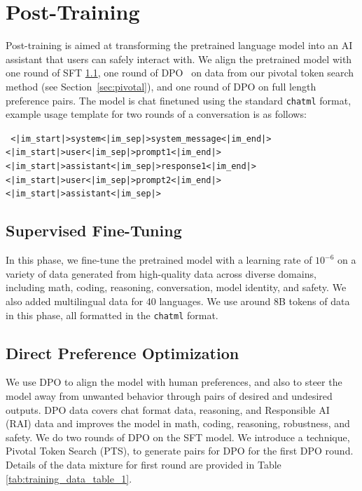 \documentclass[11pt]{article}
\begin{document}
\section{Post-Training}
Post-training is aimed at transforming the pretrained language model into an AI assistant that users can safely interact with. 
We align the pretrained model with one round of SFT \ref{sec:sft}, one round of DPO~\cite{rafailov2023direct} on data from our pivotal token search method (see Section~\ref{sec:pivotal}), and one round of DPO on full length preference pairs.
The model is chat finetuned using the standard \texttt{chatml} format, example usage template for two rounds of a conversation is as follows:
\begin{AIbox}{}
\tt \footnotesize 
<\!|\!im\_start\!|\!>system<\!|\!im\_sep\!|\!>system\_message<\!|\!im\_end\!|\!>\\
<\!|\!im\_start\!|\!>user<\!|\!im\_sep\!|\!>prompt1<\!|\!im\_end\!|\!><\!|\!im\_start\!|\!>assistant<\!|\!im\_sep\!|\!>response1<\!|\!im\_end\!|\!>\\
<\!|\!im\_start\!|\!>user<\!|\!im\_sep\!|\!>prompt2<\!|\!im\_end\!|\!><\!|\!im\_start\!|\!>assistant<\!|\!im\_sep\!|\!>
\end{AIbox}

\subsection{Supervised Fine-Tuning} \label{sec:sft}
In this phase, we fine-tune the pretrained model with a learning rate of $10^{-6}$ on a variety of data generated from high-quality data across diverse domains, including math, coding, reasoning, conversation, model identity, and safety.
We also added multilingual data for 40 languages.
We use around 8B tokens of data in this phase, all formatted in the \texttt{chatml} format.

\subsection{Direct Preference Optimization}
We use DPO \cite{rafailov2023direct} to align the model with human preferences, and also to steer the model away from unwanted behavior through pairs of desired and undesired outputs. 
DPO data covers chat format data, reasoning, and Responsible AI (RAI) data and improves the model in math, coding, reasoning, robustness, and safety.
We do two rounds of DPO on the SFT model. We introduce a technique, Pivotal Token Search (PTS), to generate pairs for DPO for the first DPO round. Details of the data mixture for first round are provided in Table \ref{tab:training_data_table_1}.
\end{document}
